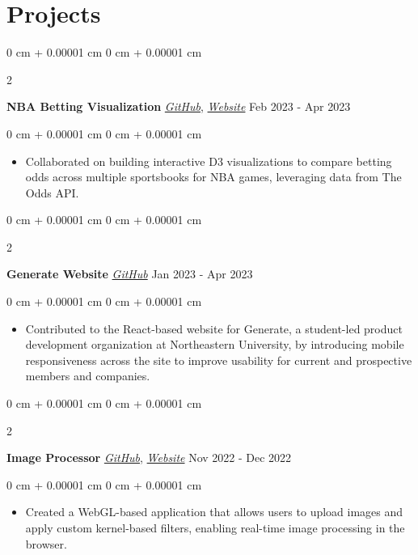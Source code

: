 \documentclass[10pt, letterpaper]{article}
\newenvironment{highlights}{
    \begin{itemize}[
        topsep=0.10 cm,
        parsep=0.10 cm,
        partopsep=0pt,
        itemsep=0pt,
        leftmargin=0 cm + 10pt
    ]
}{
    \end{itemize}
} %
\newenvironment{onecolentry}{
    \begin{adjustwidth}{
        0 cm + 0.00001 cm
    }{
        0 cm + 0.00001 cm
    }
}{
    \end{adjustwidth}
} %
\newenvironment{twocolentry}[2][]{
    \onecolentry
    \def\secondColumn{#2}
    \setcolumnwidth{\fill, 4.5 cm}
    \begin{paracol}{2}
}{
    \switchcolumn \raggedleft \secondColumn
    \end{paracol}
    \endonecolentry
} %
\begin{document}
    \section{Projects}
        \begin{twocolentry}{
            Feb 2023 - Apr 2023
        }
        \textbf{NBA Betting Visualization} \href{https://github.com/GenerateNU/website}{\textit{GitHub}}, \href{https://ds4200-s23-class.github.io/project-zach-george-filip-travis/}{\textit{Website}}\end{twocolentry}
        \vspace{0.10 cm}
        \begin{onecolentry}
            \begin{highlights}
                \item Collaborated on building interactive D3 visualizations to compare betting odds across multiple sportsbooks for NBA games, leveraging data from The Odds API.
            \end{highlights}
        \end{onecolentry}
        \vspace{0.2 cm}
        \begin{twocolentry}{
            Jan 2023 - Apr 2023
        }
        \textbf{Generate Website} \href{https://github.com/GenerateNU/website}{\textit{GitHub}}\end{twocolentry}
        \vspace{0.10 cm}
        \begin{onecolentry}
            \begin{highlights}
                \item Contributed to the React-based website for Generate, a student-led product development organization at Northeastern University, by introducing mobile responsiveness across the site to improve usability for current and prospective members and companies.
            \end{highlights}
        \end{onecolentry}
        \vspace{0.2 cm}
        \begin{twocolentry}{
            Nov 2022 - Dec 2022
        }
        \textbf{Image Processor} \href{https://github.com/zachnorman02/webgl-image-processor}{\textit{GitHub}}, \href{https://zachnorman02.github.io/webgl-image-processor/}{\textit{Website}}\end{twocolentry}
        \vspace{0.10 cm}
        \begin{onecolentry}
            \begin{highlights}
                \item  Created a WebGL-based application that allows users to upload images and apply custom kernel-based filters, enabling real-time image processing in the browser.
            \end{highlights}
        \end{onecolentry}
        \vspace{0.2 cm}
\end{document}
